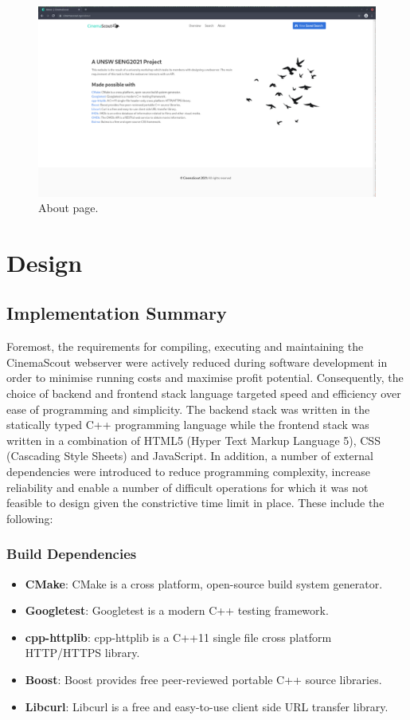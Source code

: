 \documentclass{article}
\begin{document}
\begin{figure}[H]
\includegraphics[width=\columnwidth]{res/about.png}
\caption{About page.}
\end{figure}
\newpage

\section{Design}
\subsection{Implementation Summary}
Foremost, the requirements for compiling, executing and maintaining the
CinemaScout webserver were actively reduced during software development in order
to minimise running costs and maximise profit potential. Consequently, the
choice of backend and frontend stack language targeted speed and efficiency over
ease of programming and simplicity. The backend stack was written in the 
statically typed C++ programming language while the frontend stack was written
in a combination of HTML5 (Hyper Text Markup Language 5), CSS (Cascading Style
Sheets) and JavaScript. In addition, a number of external dependencies were
introduced to reduce programming complexity, increase reliability and enable
a number of difficult operations for which it was not feasible to design given
the constrictive time limit in place. These include the following:
\subsubsection*{Build Dependencies}
\begin{itemize}
\item \textbf{CMake}: CMake is a cross platform, open-source build system
generator.
\item \textbf{Googletest}: Googletest is a modern C++ testing framework.
\item \textbf{cpp-httplib}: cpp-httplib is a C++11 single file cross platform
HTTP/HTTPS library.
\item \textbf{Boost}: Boost provides free peer-reviewed portable C++ source 
libraries.
\item \textbf{Libcurl}: Libcurl is a free and easy-to-use client side URL
transfer library.
\end{itemize}
\end{document}
